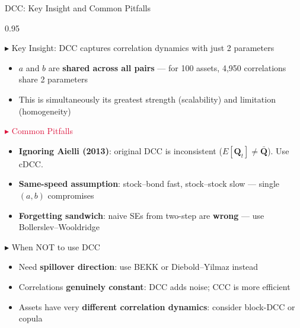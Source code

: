 \documentclass[9pt, aspectratio=169, t]{beamer}
\begin{document}

\begin{frame}{DCC: Key Insight and Common Pitfalls}
    \begin{cminipage}{0.95\textwidth}
    \vspace{-4mm}
    {\scriptsize
    \begin{block}{\textcolor{MainBlue}{$\blacktriangleright$ Key Insight}: DCC captures correlation dynamics with just 2 parameters}
        \begin{itemize}\setlength{\itemsep}{0pt}
            \item $a$ and $b$ are \textbf{shared across all pairs} --- for 100 assets, 4,950 correlations share 2 parameters
            \item This is simultaneously its greatest strength (scalability) and limitation (homogeneity)
        \end{itemize}
    \end{block}
    \vspace{-2mm}
    \begin{alertblock}{\textcolor{Crimson}{$\blacktriangleright$ Common Pitfalls}}
        \begin{itemize}\setlength{\itemsep}{0pt}
            \item \textbf{Ignoring Aielli (2013)}: original DCC is inconsistent ($E[\mathbf{Q}_t] \neq \bar{\mathbf{Q}}$). Use cDCC.
            \item \textbf{Same-speed assumption}: stock--bond fast, stock--stock slow --- single $(a,b)$ compromises
            \item \textbf{Forgetting sandwich}: naive SEs from two-step are \textbf{wrong} --- use Bollerslev--Wooldridge
        \end{itemize}
    \end{alertblock}
    \vspace{-2mm}
    \begin{exampleblock}{\textcolor{Forest}{$\blacktriangleright$ When NOT to use DCC}}
        \begin{itemize}\setlength{\itemsep}{0pt}
            \item Need \textbf{spillover direction}: use BEKK or Diebold--Yilmaz instead
            \item Correlations \textbf{genuinely constant}: DCC adds noise; CCC is more efficient
            \item Assets have very \textbf{different correlation dynamics}: consider block-DCC or copula
        \end{itemize}
    \end{exampleblock}
    }
    \end{cminipage}
\end{frame}
\end{document}
